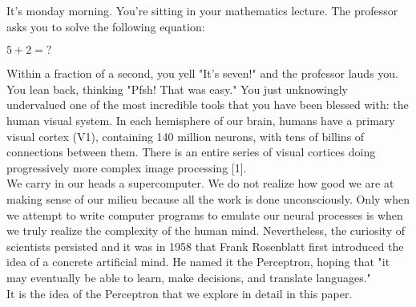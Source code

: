 
	It's monday morning. You're sitting in your mathematics lecture. The professor asks you to solve the following equation:
	
	\begin{center}
		$5 + 2 = ?$
	\end{center}
	
	Within a fraction of a second, you yell "It's seven!" and the professor lauds you. You lean back, thinking "Pfsh! That was easy."   You just unknowingly undervalued one of the most incredible tools that you have been blessed with: the human visual system. In each hemisphere of our brain, humans have a primary visual cortex (V1), containing 140 million neurons, with tens of billins of connections between them. There is an entire series of visual cortices doing progressively more complex image processing [1]. \\
	
	We carry in our heads a supercomputer. We do not realize how good we are at making sense of our milieu because all the work is done unconsciously. Only when we attempt to write computer programs to emulate our neural processes is when we truly realize the complexity of the human mind. Nevertheless, the curiosity of scientists persisted and it was in 1958 that Frank Rosenblatt first introduced the idea of a concrete artificial mind. He named it the Perceptron, hoping that "it may eventually be able to learn, make decisions, and translate languages." \\
	
	It is the idea of the Perceptron that we explore in detail in this paper. 

